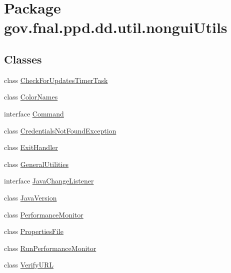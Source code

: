 \hypertarget{namespacegov_1_1fnal_1_1ppd_1_1dd_1_1util_1_1nonguiUtils}{\section{Package gov.\-fnal.\-ppd.\-dd.\-util.\-nongui\-Utils}
\label{namespacegov_1_1fnal_1_1ppd_1_1dd_1_1util_1_1nonguiUtils}
}
\subsection*{Classes}
\begin{DoxyCompactItemize}
\item 
class \hyperlink{classgov_1_1fnal_1_1ppd_1_1dd_1_1util_1_1nonguiUtils_1_1CheckForUpdatesTimerTask}{Check\-For\-Updates\-Timer\-Task}
\item 
class \hyperlink{classgov_1_1fnal_1_1ppd_1_1dd_1_1util_1_1nonguiUtils_1_1ColorNames}{Color\-Names}
\item 
interface \hyperlink{interfacegov_1_1fnal_1_1ppd_1_1dd_1_1util_1_1nonguiUtils_1_1Command}{Command}
\item 
class \hyperlink{classgov_1_1fnal_1_1ppd_1_1dd_1_1util_1_1nonguiUtils_1_1CredentialsNotFoundException}{Credentials\-Not\-Found\-Exception}
\item 
class \hyperlink{classgov_1_1fnal_1_1ppd_1_1dd_1_1util_1_1nonguiUtils_1_1ExitHandler}{Exit\-Handler}
\item 
class \hyperlink{classgov_1_1fnal_1_1ppd_1_1dd_1_1util_1_1nonguiUtils_1_1GeneralUtilities}{General\-Utilities}
\item 
interface \hyperlink{interfacegov_1_1fnal_1_1ppd_1_1dd_1_1util_1_1nonguiUtils_1_1JavaChangeListener}{Java\-Change\-Listener}
\item 
class \hyperlink{classgov_1_1fnal_1_1ppd_1_1dd_1_1util_1_1nonguiUtils_1_1JavaVersion}{Java\-Version}
\item 
class \hyperlink{classgov_1_1fnal_1_1ppd_1_1dd_1_1util_1_1nonguiUtils_1_1PerformanceMonitor}{Performance\-Monitor}
\item 
class \hyperlink{classgov_1_1fnal_1_1ppd_1_1dd_1_1util_1_1nonguiUtils_1_1PropertiesFile}{Properties\-File}
\item 
class \hyperlink{classgov_1_1fnal_1_1ppd_1_1dd_1_1util_1_1nonguiUtils_1_1RunPerformanceMonitor}{Run\-Performance\-Monitor}
\item 
class \hyperlink{classgov_1_1fnal_1_1ppd_1_1dd_1_1util_1_1nonguiUtils_1_1VerifyURL}{Verify\-U\-R\-L}
\end{DoxyCompactItemize}


